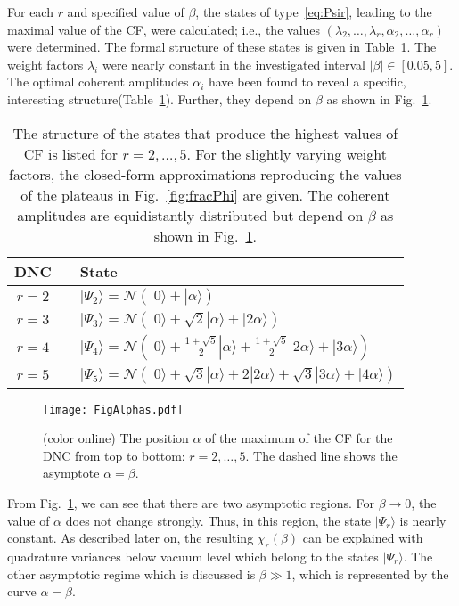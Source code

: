 \documentclass[aps,pra,twocolumn,showpacs,superscriptaddress,10pt]{revtex4-1}
\begin{document}
	For each $r$ and specified value of $\beta$, the states of type~\eqref{eq:Psir}, leading to the maximal value of the CF, were calculated; i.e., the values $(\lambda_2,\dots,\lambda_r,\alpha_2,\dots,\alpha_r)$ were determined.
	The formal structure of these states is given in Table~\ref{tab:states}.
	The weight factors $\lambda_i$ were nearly constant in the investigated interval $|\beta|\in[0.05,5]$.
	The optimal coherent amplitudes $\alpha_i$ have been found to reveal a specific, interesting structure(Table~\ref{tab:states}).
	Further, they depend on $\beta$ as shown in Fig.~\ref{fig:alphas}.

\begin{table}[ht]
	\caption{
		The structure of the states that produce the highest values of CF is listed for $r=2,\dots,5$.
		For the slightly varying weight factors, the closed-form approximations reproducing the values of the plateaus in Fig.~\ref{fig:fracPhi} are given.
		The coherent amplitudes are equidistantly distributed but depend on $\beta$ as shown in Fig.~\ref{fig:alphas}.
	}\label{tab:states}
	\begin{tabular}{cc l}
		\hline\hline
		DNC && State\\
		\hline
		$r=2$&&$|\Psi_2\rangle=\mathcal{N}(|0\rangle+|\alpha\rangle)$\\
		$r=3$&&$|\Psi_3\rangle=\mathcal{N}(|0\rangle+\sqrt{2}|\alpha\rangle+|2\alpha\rangle)$\\
		$r=4$&&$|\Psi_4\rangle=\mathcal{N}(|0\rangle+\frac{1+\sqrt{5}}{2}|\alpha\rangle+\frac{1+\sqrt{5}}{2}|2\alpha\rangle+|3\alpha\rangle)$\\
		$r=5$&&$|\Psi_5\rangle=\mathcal{N}(|0\rangle+\sqrt{3}|\alpha\rangle+2|2\alpha\rangle+\sqrt{3}|3\alpha\rangle+|4\alpha\rangle)$\\
		\hline\hline
	\end{tabular}
\end{table}

\begin{figure}[ht]
	 \texttt{[image: FigAlphas.pdf]}
	 \caption{(color online)
		The position $\alpha$ of the maximum of the CF for the DNC from top to bottom: $r=2,\dots,5$.
		The dashed line shows the asymptote $\alpha=\beta$.
	}\label{fig:alphas}
\end{figure}

	From Fig.~\ref{fig:alphas}, we can see that there are two asymptotic regions.
	For $\beta\to0$, the value of $\alpha$ does not change strongly.
	Thus, in this region, the state $|\Psi_r\rangle$ is nearly constant.
	As described later on, the resulting $\chi_r(\beta)$ can be explained with quadrature variances below vacuum level which belong to the states $|\Psi_r\rangle$.
	The other asymptotic regime which is discussed is $\beta\gg1$, which is represented by the curve $\alpha=\beta$.
\end{document}
